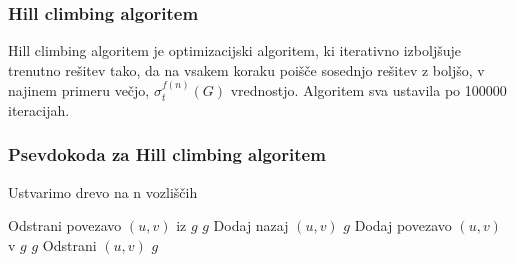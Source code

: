 \documentclass{article}
\begin{document}
\vspace*{1cm}

\subsubsection*{Hill climbing algoritem}
Hill climbing algoritem je optimizacijski algoritem,
ki iterativno izboljšuje trenutno rešitev tako, da na vsakem koraku
poišče sosednjo rešitev z boljšo, v najinem primeru večjo, $\sigma_t^{f(n)}(G)$
vrednostjo. Algoritem sva ustavila po 100000 iteracijah. 

\subsubsection*{Psevdokoda za Hill climbing algoritem}



    \begin{algorithmic}[1]
    
        \State Ustvarimo drevo na n vozliščih
    \EndFunction
    
            \State Odstrani povezavo $(u, v)$ iz $g$
                \State \Return $g$
            \Else
                \State Dodaj nazaj $(u, v)$
                \State \Return $g$
            \EndIf
        \Else
            \State Dodaj povezavo $(u, v)$ v $g$
                \State \Return $g$
            \Else
                \State Odstrani $(u, v)$
                \State \Return $g$ 
            \EndIf
        \EndIf
    \EndFunction 
    
    \end{algorithmic}

    \vspace*{1cm}
   
\end{document}

